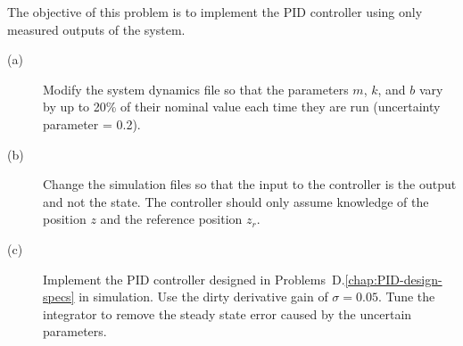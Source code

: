 The objective of this problem is to implement the PID controller using only measured outputs of the system.
\begin{description}
\item[(a)]  Modify the system dynamics file so that the parameters $m$, $k$, and $b$ vary by up to 20\% of their nominal value each time they are run (uncertainty parameter = 0.2).
\item[(b)]  Change the simulation files so that the input to the controller is the output and not the state.  The controller should only assume knowledge of the position $z$ and the reference position $z_r$.
\item[(c)]  Implement the PID controller designed in Problems~D.\ref{chap:PID-design-specs} in simulation.  Use the dirty derivative gain of $\sigma=0.05$. Tune the integrator to remove the steady state error caused by the uncertain parameters. 
\end{description}
